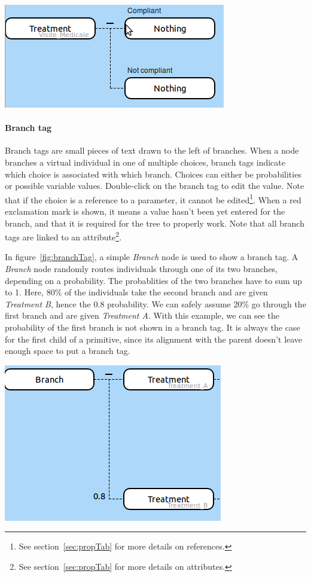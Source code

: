 \documentclass[a4paper,11pt]{report}
\begin{document}
\begin{center}
\includegraphics[scale=0.4]{Pictures/TreeEditor/nodeTag.png}
\label{fig:nodeTag}
\end{center}

\paragraph{Branch tag}
Branch tags are small pieces of text drawn to the left of branches. When a node branches a virtual individual in one of multiple choices, branch tags indicate which choice is associated with which branch. Choices can either be probabilities or possible variable values. Double-click on the branch tag to edit the value. Note that if the choice is a reference to a parameter, it cannot be edited\footnote{See section~\ref{sec:propTab} for more details on references.}. When a red exclamation mark is shown, it means a value hasn't been yet entered for the branch, and that it is required for the tree to properly work. Note that all branch tags are linked to an attribute\footnote{See section~\ref{sec:propTab} for more details on attributes.}. 

In figure~\ref{fig:branchTag}, a simple \emph{Branch} node is used to show a branch tag. A \emph{Branch} node randomly routes individuals through one of its two branches, depending on a probability. The probablities of the two branches have to sum up to 1. Here, 80\% of the individuals take the second branch and are given \emph{Treatment B}, hence the 0.8 probability. We can safely assume 20\% go through the first branch and are given \emph{Treatment A}. With this example, we can see the probability of the first branch is not shown in a branch tag. It is always the case for the first child of a primitive, since its alignment with the parent doesn't leave enough space to put a branch tag.
 
\begin{center}
\includegraphics[scale=0.4]{Pictures/TreeEditor/nodeBranchTag.png}
\label{fig:branchTag}
\end{center}
\end{document}
